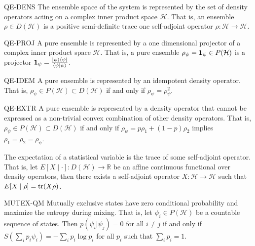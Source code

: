 \begin{condition}{QE-DENS}
	The ensemble space of the system is represented by the set of density operators acting on a complex inner product space $\mathcal{H}$. That is, an ensemble $\rho \in D(\mathcal{H})$ is a positive semi-definite trace one self-adjoint operator $\rho : \mathcal{H} \to \mathcal{H}$. 
\end{condition}

\begin{condition}{QE-PROJ}
	A pure ensemble is represented by a one dimensional projector  of a complex inner product space $\mathcal{H}$. That is, a pure ensemble $\rho_{\psi} = \indicator[\psi] \in P(\mathcal{H})$ is a projector  $\indicator[\psi] = \frac{| \psi \> \< \psi |}{\< \psi | \psi \>}$.
\end{condition}

\begin{condition}{QE-IDEM}
	A pure ensemble is represented by an idempotent density operator. That is, $\rho_{\psi} \in P(\mathcal{H}) \subset D(\mathcal{H})$ if and only if $\rho_{\psi} = \rho_{\psi}^2$.
\end{condition}

\begin{condition}{QE-EXTR}
	A pure ensemble is represented by a density operator that cannot be expressed as a non-trivial convex combination of other density operators. That is, $\rho_{\psi} \in P(\mathcal{H}) \subset D(\mathcal{H})$ if and only if $\rho_{\psi} = p \rho_1 + (1-p) \rho_2$ implies $\rho_1 = \rho_2 = \rho_{\psi}$.
\end{condition}

\begin{conj}
	The expectation of a statistical variable is the trace of some self-adjoint operator. That is, let $E[X\mid \cdot] : D(\mathcal{H}) \to \mathbb{R}$ be an affine continuous functional over density operators, then there exists a self-adjoint operator $X : \mathcal{H} \to \mathcal{H}$ such that $E[X\mid \rho] = \tr(X\rho)$.
\end{conj}

\begin{condition}{MUTEX-QM}
	Mutually exclusive states have zero conditional probability and maximize the entropy during mixing. That is, let $\psi_i \in P(\mathcal{H})$ be a countable sequence of states. Then $p(\psi_i | \psi_j) = 0$ for all $i \neq j$ if and only if $S(\sum_i p_i \psi_i) = - \sum_i p_i \log p_i$ for all $p_i$ such that $\sum_i p_i = 1$.
\end{condition}

